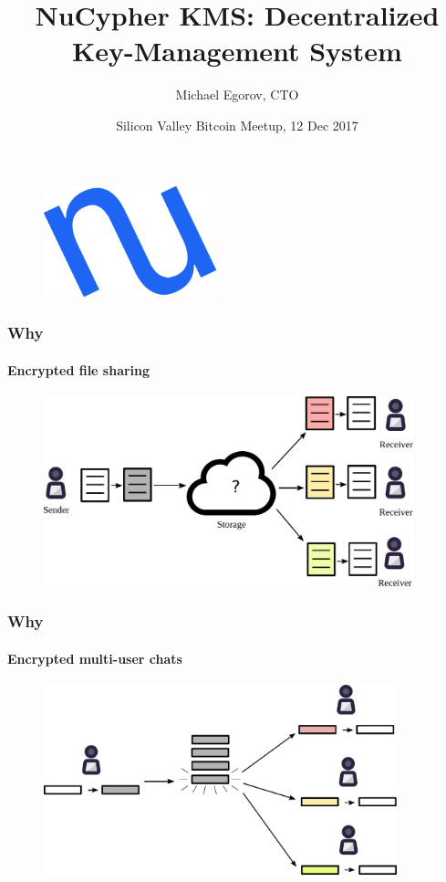 \documentclass[xetex,mathsans,sans]{beamer}
\title[NuCypher KMS]{NuCypher KMS: Decentralized Key-Management System}
\author[Michael]{Michael Egorov, CTO}
\date[29 Nov 2017]{Silicon Valley Bitcoin Meetup, 12 Dec 2017}
\begin{document}
    \begin{frame}
        \titlepage
        \begin{figure}
            \centering
            \includegraphics[width=5cm]{pdf/nucypher_logo.pdf}
        \end{figure}
    \end{frame}

    \begin{frame}
        \frametitle{Why}
        \framesubtitle{Encrypted file sharing}
        \begin{figure}
            \centering
            \includegraphics[height=5.5cm]{pdf/file-sharing.pdf}
        \end{figure}
    \end{frame}

    \begin{frame}
        \frametitle{Why}
        \framesubtitle{Encrypted multi-user chats}
        \begin{figure}
            \centering
            \includegraphics[height=5.5cm]{pdf/chats.pdf}
        \end{figure}
    \end{frame}
\end{document}
